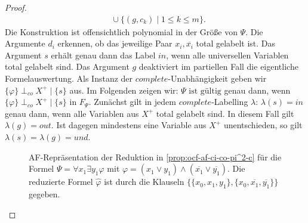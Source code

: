 \begin{proof}
\[\begin{split}
        &{}\cup
        \{(g,c_k)\mid 1\leq k\leq m\}.
    \end{split}
    \]
    Die Konstruktion ist offensichtlich polynomial in der
    Größe von \(\Psi\).
    Die Argumente \(d_i\) erkennen, ob das jeweilige Paar
    \(x_i,\overline{x_i}\) total gelabelt ist. Das Argument \(s\) erhält genau dann das Label \(in\), wenn alle
    universellen Variablen total gelabelt sind. Das Argument
    \(g\) deaktiviert im partiellen Fall die eigentliche
    Formelauswertung.
    Als Instanz der \(complete\)-Unabhängigkeit geben wir
    \(
        \{\varphi\}
        \perp_{co}
        X^{+}
        \mid
        \{s\}
    \)
    aus.  Im Folgenden zeigen wir:
    \(
        \Psi\text{ ist gültig}
    \)
    genau dann, wenn
    \(
        \{\varphi\}
        \perp_{co}
        X^{+}
        \mid
        \{s\}
        \text{ in }F_{\Psi}.
    \)
    Zunächst gilt in jedem \(complete\)-Labelling \(\lambda\):
    \(
        \lambda(s)=in
    \)
    genau dann, wenn alle Variablen aus \(X^{+}\) total gelabelt sind.
    In diesem Fall gilt \(\lambda(g)=out\). Ist dagegen mindestens
    eine Variable aus \(X^{+}\) unentschieden, so gilt
    \(\lambda(s)=\lambda(g)=und\).

    \begin{figure}
        \centering
        \resizebox{\textwidth}{!}{
            
        }
        \caption{AF-Repräsentation der Reduktion in \ref{prop:ocf-af-ci-co-pi^2-c} für die Formel
            \(\Psi = \forall x_1 \exists y_1 \varphi\) mit
            \(\varphi =
            (x_1 \lor y_1) \land
            (\overline{x_1} \lor \overline{y_1})\).
            Die reduzierte Formel \(\widehat{\varphi}\) ist durch die Klauseln
            \(\{\{x_0,x_1,y_1\},
            \{x_0,\overline{x_1},\overline{y_1}\}\}\)
            gegeben.}
    \label{fig:reduktion-complete}
    \end{figure}


\end{proof}
